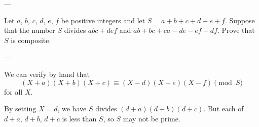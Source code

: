 
---

Let $a$, $b$, $c$, $d$, $e$, $f$ be positive integers and let $S=a+b+c+d+e+f$.
Suppose that the number $S$ divides $abc+def$ and $ab+bc+ca-de-ef-df$. Prove that $S$ is composite.

---

We can verify by hand that
\[(X+a)(X+b)(X+c)\equiv(X-d)(X-e)(X-f)\pmod S\]
for all $X$.

By setting $X=d$, we have $S$ divides $(d+a)(d+b)(d+c)$.
But each of $d+a$, $d+b$, $d+c$ is less than $S$, so $S$ may not be prime.


